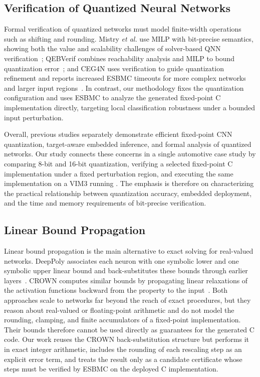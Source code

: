 \subsection{Verification of Quantized Neural Networks}


Formal verification of quantized networks must model finite-width operations such as shifting and rounding. Mistry \emph{et al.} use MILP with bit-precise semantics, showing both the value and scalability challenges of solver-based QNN verification~\cite{Mistry2022MILP}; QEBVerif combines reachability analysis and MILP to bound quantization error~\cite{Zhang2023QEBVerif}; and CEG4N uses verification to guide quantization refinement and reports increased ESBMC timeouts for more complex networks and larger input regions~\cite{Matos2022CEG4N}. In contrast, our methodology fixes the quantization configuration and uses ESBMC to analyze the generated fixed-point C implementation directly, targeting local classification robustness under a bounded input perturbation.

Overall, previous studies separately demonstrate efficient fixed-point CNN quantization, target-aware embedded inference, and formal analysis of quantized networks. Our study connects these concerns in a single automotive case study by comparing 8-bit and 16-bit quantization, verifying a selected fixed-point C implementation under a fixed perturbation region, and executing the same implementation on a VIM3 running \AAOS{}. The emphasis is therefore on characterizing the practical relationship between quantization accuracy, embedded deployment, and the time and memory requirements of bit-precise verification.

\subsection{Linear Bound Propagation}

Linear bound propagation is the main alternative to exact solving for real-valued networks. DeepPoly associates each neuron with one symbolic lower and one symbolic upper linear bound and back-substitutes these bounds through earlier layers~\cite{Singh2019DeepPoly}. CROWN computes similar bounds by propagating linear relaxations of the activation functions backward from the property to the input~\cite{3327345.3327402}. Both approaches scale to networks far beyond the reach of exact procedures, but they reason about real-valued or floating-point arithmetic and do not model the rounding, clamping, and finite accumulators of a fixed-point implementation. Their bounds therefore cannot be used directly as guarantees for the generated C code. Our work reuses the CROWN back-substitution structure but performs it in exact integer arithmetic, includes the rounding of each rescaling step as an explicit error term, and treats the result only as a candidate certificate whose steps must be verified by ESBMC on the deployed C implementation.


